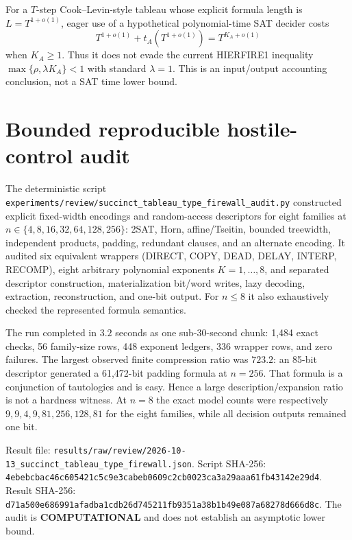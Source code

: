 \documentclass[11pt]{article}
\newcommand{\COMP}{\textbf{COMPUTATIONAL}}
\begin{document}
For a $T$-step Cook--Levin-style tableau whose explicit formula length is
$L=T^{1+o(1)}$, eager use of a hypothetical polynomial-time SAT decider costs
\[
  T^{1+o(1)}+t_A(T^{1+o(1)})=T^{K_A+o(1)}
\]
when $K_A\geq1$.  Thus it does not evade the current HIERFIRE1 inequality
$\max\{\rho,\lambda K_A\}<1$ with standard $\lambda=1$.  This is an input/output
accounting conclusion, not a SAT time lower bound.

\section*{Bounded reproducible hostile-control audit}
The deterministic script
\texttt{experiments/review/succinct\_tableau\_type\_firewall\_audit.py}
constructed explicit fixed-width encodings and random-access descriptors for
eight families at $n\in\{4,8,16,32,64,128,256\}$:
2SAT, Horn, affine/Tseitin, bounded treewidth, independent products, padding,
redundant clauses, and an alternate encoding.  It audited six equivalent
wrappers (DIRECT, COPY, DEAD, DELAY, INTERP, RECOMP), eight arbitrary polynomial
exponents $K=1,\dots,8$, and separated descriptor construction, materialization
bit/word writes, lazy decoding, extraction, reconstruction, and one-bit output.
For $n\leq8$ it also exhaustively checked the represented formula semantics.

The run completed in $3.2$ seconds as one sub-30-second chunk: 1,484 exact
checks, 56 family-size rows, 448 exponent ledgers, 336 wrapper rows, and zero
failures.  The largest observed finite compression ratio was $723.2$: an
85-bit descriptor generated a 61,472-bit padding formula at $n=256$.  That
formula is a conjunction of tautologies and is easy.  Hence a large
description/expansion ratio is not a hardness witness.  At $n=8$ the exact
model counts were respectively $9,9,4,9,81,256,128,81$ for the eight families,
while all decision outputs remained one bit.

Result file:
\texttt{results/raw/review/2026-10-13\_succinct\_tableau\_type\_firewall.json}.
Script SHA-256:
\texttt{4ebebcbac46c605421c5c9e3cabeb0609c2cb0023ca3a29aaa61fb43142e29d4}.
Result SHA-256:
\texttt{d71a500e686991afadba1cdb26d745211fb9351a38b1b49e087a68278d666d8c}.
The audit is \COMP{} and does not establish an asymptotic lower bound.
\end{document}
